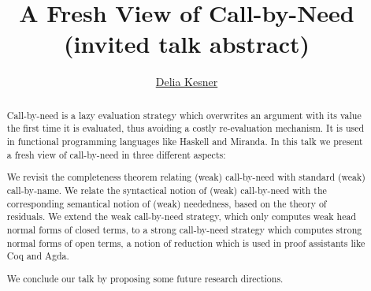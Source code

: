 \documentclass[submission,copyright,creativecommons]{eptcs}
\title{A Fresh View of Call-by-Need\\
  {\large (invited talk abstract)}
}
\author{\href{https://www.irif.fr/~kesner/}{Delia Kesner}
  \institute{IRIF, CNRS and Université Paris Diderot}
  \institute{School of Computer Science and Engineering}
  \email{kesner@irif.fr}
}
\begin{document}
\maketitle

\begin{abstract}
  Call-by-need is a lazy evaluation strategy which overwrites an
  argument with its value the first time it is evaluated, thus
  avoiding a costly re-evaluation mechanism. It is used in functional
  programming languages like Haskell and Miranda. In this talk we
  present a fresh view of call-by-need in three different aspects:

  We revisit the completeness theorem relating (weak) call-by-need
  with standard (weak) call-by-name. We relate the syntactical notion
  of (weak) call-by-need with the corresponding semantical notion of
  (weak) neededness, based on the theory of residuals. We extend the
  weak call-by-need strategy, which only computes weak head normal
  forms of closed terms, to a strong call-by-need strategy which
  computes strong normal forms of open terms, a notion of reduction
  which is used in proof assistants like Coq and Agda.

  We conclude our talk by proposing some future research directions.
\end{abstract}
\end{document}
